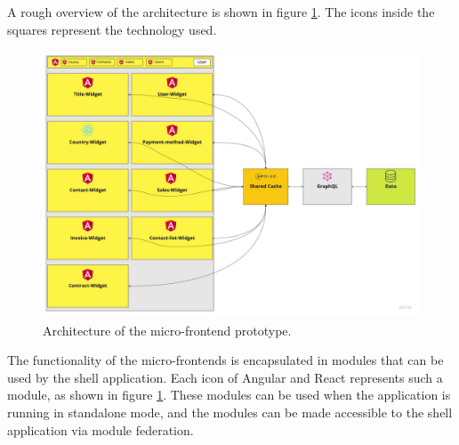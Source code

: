 \documentclass[MSE,Master,english]{twbook}%
\begin{document}

A rough overview of the architecture is shown in figure \ref{figure:methods:ui-dashboard-architecture}. The icons inside the squares represent the technology used.

\ifshowImages
\begin{figure}[H]
\centering
\includegraphics[width=0.8\linewidth]{images/ui-dashboard-architecture.jpg}
\caption{Architecture of the micro-frontend prototype.}\label{figure:methods:ui-dashboard-architecture}
\end{figure}
\fi

The functionality of the micro-frontends is encapsulated in modules that can be used by the shell application. Each icon of Angular and React represents such a module, as shown in figure \ref{figure:methods:ui-dashboard-architecture}. These modules can be used when the application is running in standalone mode, and the modules can be made accessible to the shell application via module federation.

\ifshowUnusedContent

\end{document}
